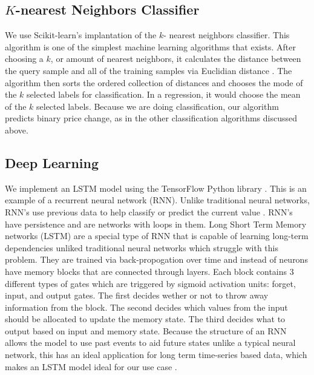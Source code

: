 \documentclass[../thesis.tex]{subfiles}
\begin{document}
\subsection{$K$-nearest Neighbors Classifier}
We use Scikit-learn's implantation of the $k$- nearest neighbors classifier. This algorithm is one of the simplest machine learning algorithms that exists. After choosing a $k$, or amount of nearest neighbors, it calculates the distance between the query sample and all of the training samples via Euclidian distance \cite{PedregosaFABIANPEDREGOSA2011}. The algorithm then sorts the ordered collection of distances and chooses the mode of the $k$ selected labels for classification. In a regression, it would choose the mean of the $k$ selected labels. Because we are doing classification, our algorithm predicts binary price change, as in the other classification algorithms discussed above. 

\subsection{Deep Learning}
We implement an LSTM model using the TensorFlow Python library \cite{Abadi}. This is an example of a recurrent neural network (RNN). Unlike traditional neural networks, RNN's use previous data to help classify or predict the current value \cite{Colah2015}. RNN's have persistence and are networks with loops in them. Long Short Term Memory networks (LSTM) are a special type of RNN that is capable of learning long-term dependencies unliked traditional neural networks which struggle with this problem. They are trained via back-propogation over time and instead of neurons have memory blocks that are connected through layers. Each block contains 3 different types of gates which are triggered by sigmoid activation units: forget, input, and output gates. The first decides wether or not to throw away information from the block. The second decides which values from the input should be allocated to update the memory state. The third decides what to output based on input and memory state. Because the structure of an RNN allows the model to use past events to aid future states unlike a typical neural network, this has an ideal application for long term time-series based data, which makes an LSTM model ideal for our use case \cite{Colah2015}.

\end{document}
